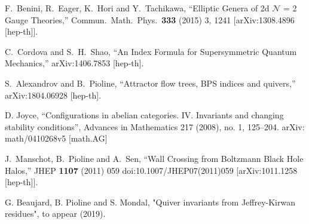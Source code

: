 \documentclass[12pt]{article}
\begin{document}
\begin{thebibliography}{9}
  F.~Benini, R.~Eager, K.~Hori and Y.~Tachikawa,
  ``Elliptic Genera of 2d ${\mathcal{N}}$ = 2 Gauge Theories,''
  Commun.\ Math.\ Phys.\  {\bf 333} (2015) 3,  1241
  [arXiv:1308.4896 [hep-th]].

  C.~Cordova and S.~H.~Shao,
  ``An Index Formula for Supersymmetric Quantum Mechanics,''
  arXiv:1406.7853 [hep-th].
     

  S.~Alexandrov and B.~Pioline,
  ``Attractor flow trees, BPS indices and quivers,''
  arXiv:1804.06928 [hep-th].

D. Joyce, ``Configurations in abelian categories. IV. Invariants and changing stability conditions'',
Advances in Mathematics 217 (2008), no. 1, 125–204.
arXiv: math/0410268v5 [math.AG]

  J.~Manschot, B.~Pioline and A.~Sen,
  ``Wall Crossing from Boltzmann Black Hole Halos,''
  JHEP {\bf 1107} (2011) 059
  doi:10.1007/JHEP07(2011)059
  [arXiv:1011.1258 [hep-th]].

G. Beaujard, B. Pioline and S. Mondal, "Quiver invariants from Jeffrey-Kirwan residues", to appear (2019).    


\end{thebibliography}
\end{document}
